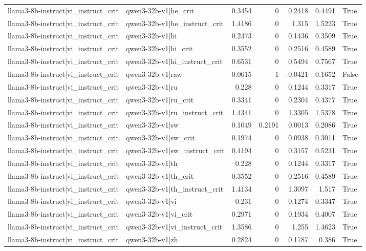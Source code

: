 \begin{table}
\begin{tabular}{l l r r r r l}
llama3-8b-instruct|vi_instruct_crit & qwen3-32b-v1|he_crit & 0.3454 & 0 & 0.2418 & 0.4491 & True \\
llama3-8b-instruct|vi_instruct_crit & qwen3-32b-v1|he_instruct_crit & 1.4186 & 0 & 1.315 & 1.5223 & True \\
llama3-8b-instruct|vi_instruct_crit & qwen3-32b-v1|hi & 0.2473 & 0 & 0.1436 & 0.3509 & True \\
llama3-8b-instruct|vi_instruct_crit & qwen3-32b-v1|hi_crit & 0.3552 & 0 & 0.2516 & 0.4589 & True \\
llama3-8b-instruct|vi_instruct_crit & qwen3-32b-v1|hi_instruct_crit & 0.6531 & 0 & 0.5494 & 0.7567 & True \\
llama3-8b-instruct|vi_instruct_crit & qwen3-32b-v1|raw & 0.0615 & 1 & -0.0421 & 0.1652 & False \\
llama3-8b-instruct|vi_instruct_crit & qwen3-32b-v1|ru & 0.228 & 0 & 0.1244 & 0.3317 & True \\
llama3-8b-instruct|vi_instruct_crit & qwen3-32b-v1|ru_crit & 0.3341 & 0 & 0.2304 & 0.4377 & True \\
llama3-8b-instruct|vi_instruct_crit & qwen3-32b-v1|ru_instruct_crit & 1.4341 & 0 & 1.3305 & 1.5378 & True \\
llama3-8b-instruct|vi_instruct_crit & qwen3-32b-v1|sw & 0.1049 & 0.2191 & 0.0013 & 0.2086 & True \\
llama3-8b-instruct|vi_instruct_crit & qwen3-32b-v1|sw_crit & 0.1974 & 0 & 0.0938 & 0.3011 & True \\
llama3-8b-instruct|vi_instruct_crit & qwen3-32b-v1|sw_instruct_crit & 0.4194 & 0 & 0.3157 & 0.5231 & True \\
llama3-8b-instruct|vi_instruct_crit & qwen3-32b-v1|th & 0.228 & 0 & 0.1244 & 0.3317 & True \\
llama3-8b-instruct|vi_instruct_crit & qwen3-32b-v1|th_crit & 0.3552 & 0 & 0.2516 & 0.4589 & True \\
llama3-8b-instruct|vi_instruct_crit & qwen3-32b-v1|th_instruct_crit & 1.4134 & 0 & 1.3097 & 1.517 & True \\
llama3-8b-instruct|vi_instruct_crit & qwen3-32b-v1|vi & 0.231 & 0 & 0.1274 & 0.3347 & True \\
llama3-8b-instruct|vi_instruct_crit & qwen3-32b-v1|vi_crit & 0.2971 & 0 & 0.1934 & 0.4007 & True \\
llama3-8b-instruct|vi_instruct_crit & qwen3-32b-v1|vi_instruct_crit & 1.3586 & 0 & 1.255 & 1.4623 & True \\
llama3-8b-instruct|vi_instruct_crit & qwen3-32b-v1|zh & 0.2824 & 0 & 0.1787 & 0.386 & True \\

\end{tabular}
\end{table}
